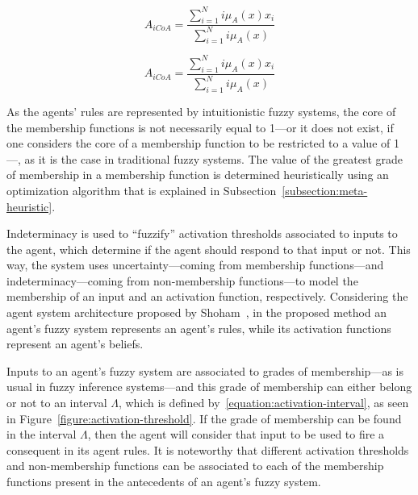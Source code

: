 \documentclass{ieeeaccess}
\begin{document}

\begin{equation}
  \label{equation:mf-domain}
  A_{iCoA} = \dfrac{\sum_{i=1}^{N} i\mu_{A}(x) x_{i}}{\sum_{i=1}^{N}
    i\mu_{A}(x)}
\end{equation}

\begin{equation}
  \label{equation:ant-con-domain}
  A_{iCoA} = \dfrac{\sum_{i=1}^{N} i\mu_{A}(x) x_{i}}{\sum_{i=1}^{N}
    i\mu_{A}(x)}
\end{equation}

As the agents' rules are represented by intuitionistic fuzzy systems, the core of
the membership functions is not necessarily equal to 1---or it does not exist,
if one considers the core of a membership function to be restricted to a value
of 1---, as it is the case in traditional fuzzy systems. %
The value of the greatest
grade of membership in a membership function is determined heuristically using
an optimization algorithm that is explained in
Subsection~\ref{subsection:meta-heuristic}.

Indeterminacy is used to ``fuzzify'' activation thresholds associated to inputs
to the agent, which determine if the agent should respond to that input or
not. This way, the system uses uncertainty---coming from membership
functions---and indeterminacy---coming from non-membership functions---to model
the membership of an input and an activation function,
respectively. Considering the agent system architecture proposed by
Shoham~\cite{Shoham1993}, in the proposed method an agent's fuzzy system
represents an agent's rules, while its activation functions represent an
agent's beliefs.

Inputs to an agent's fuzzy system are associated to grades of membership---as
is usual in fuzzy inference systems---and this grade of membership can either
belong or not to an interval $\Lambda$, which is defined by~\ref{equation:activation-interval}, as seen in
Figure~\ref{figure:activation-threshold}. If the grade of membership can be
found in the interval $\Lambda$, then the agent will consider that input to be
used to fire a consequent in its agent rules. It is noteworthy that different
activation thresholds and non-membership functions can be associated to each of
the membership functions present in the antecedents of an agent's fuzzy system.
\end{document}
